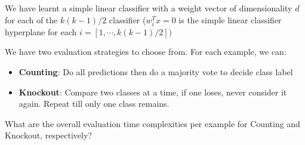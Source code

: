 \documentclass[11pt]{article}
\begin{document}
\begin{enumerate}
We have learnt a simple linear classifier with a weight vector of dimensionality $d$ for each of the $ k(k-1)/2$ classifier ($w_i^T x = 0$ is the simple linear classifier hyperplane for each  $i =[1, \cdots , k(k-1)/2] )$

We have two evaluation strategies to choose from. For each example, we can:
\begin{itemize}
  \item \textbf{Counting}: Do all predictions then do a majority vote to decide class label
  \item \textbf{Knockout}: Compare two classes at a time, if one loses, never consider it
again. Repeat till only one class remains.
\end{itemize}
What are the overall evaluation time complexities per example for Counting and
Knockout, respectively?

\solution{
}

\end{enumerate}
\end{document}
